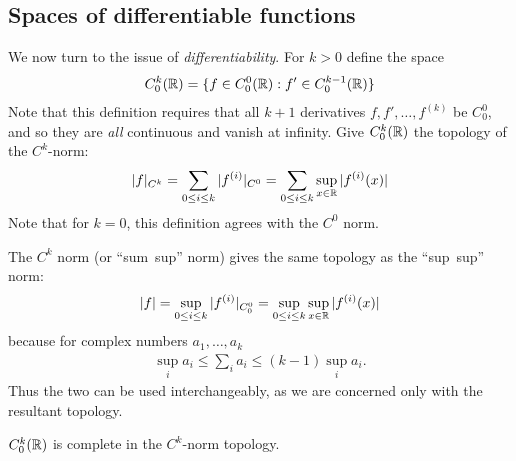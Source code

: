     \subsection{Spaces of differentiable functions}
      We now turn to the issue of \emph{differentiability}.
      For $k>0$ define the space 
      \begin{align*}
        C^k_0(\mathbb{R}) = \{f\in C^0_0(\mathbb{R}) : f'\in C^{k-1}_0(\mathbb{R})\}
      \end{align*}
      Note that this definition requires that all $k+1$ derivatives $f,f',\ldots,f^{(k)}$ be $C^0_0$, and so they are \emph{all} continuous and vanish at infinity.
      Give $C^k_0(\mathbb{R})$ the topology of the $C^k$-norm:
      \begin{align*}
        |f|_{C^k} = \sum_{0\le i\le k} |f^{(i)}|_{C^0} = \sum_{0\le i\le k} \sup_{x\in\mathbb{R}}|f^{(i)}(x)|
      \end{align*}
      Note that for $k=0$, this definition agrees with the $C^0$ norm.
      \begin{rmk}
        The $C^k$ norm (or ``sum~sup'' norm) gives the same topology as the ``sup~sup'' norm:
        \begin{align*}
          |f|=\sup_{0\le i\le k}|f^{(i)}|_{C^0_0}=\sup_{0\le i\le k}\sup_{x\in\mathbb{R}}|f^{(i)}(x)|
        \end{align*}
        because for complex numbers $a_1,\ldots,a_k$
        \begin{align*}
          \sup_i a_i \le \sum_i a_i \le (k-1) \sup_i a_i\text{.}
        \end{align*}
        Thus the two can be used interchangeably, as we are concerned only with the resultant topology.
      \end{rmk}
      \begin{rmk}
      \end{rmk}
      \begin{thm}
        \label{thm:ck0complete}
        $C^k_0(\mathbb{R})$ is complete in the $C^k$-norm topology.
      \end{thm}
